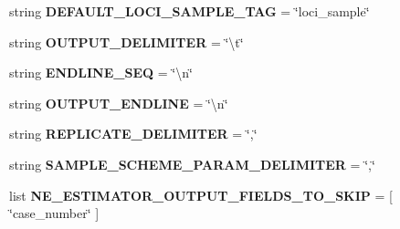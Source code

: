 \begin{DoxyCompactItemize}
\item 
string {\bfseries D\+E\+F\+A\+U\+L\+T\+\_\+\+L\+O\+C\+I\+\_\+\+S\+A\+M\+P\+L\+E\+\_\+\+T\+AG} = \char`\"{}loci\+\_\+sample\char`\"{}\hypertarget{namespacenegui_1_1pgdriveneestimator_a31ddb30a42003f3bd52b0209ecd9616d}{}\label{namespacenegui_1_1pgdriveneestimator_a31ddb30a42003f3bd52b0209ecd9616d}

\item 
string {\bfseries O\+U\+T\+P\+U\+T\+\_\+\+D\+E\+L\+I\+M\+I\+T\+ER} = \char`\"{}\textbackslash{}t\char`\"{}\hypertarget{namespacenegui_1_1pgdriveneestimator_a68b08075d6e1a58ae325c600881c9d6c}{}\label{namespacenegui_1_1pgdriveneestimator_a68b08075d6e1a58ae325c600881c9d6c}

\item 
string {\bfseries E\+N\+D\+L\+I\+N\+E\+\_\+\+S\+EQ} = \char`\"{}\textbackslash{}n\char`\"{}\hypertarget{namespacenegui_1_1pgdriveneestimator_aa8d38cb5ca07a3c1f89cd4c3d7cccb08}{}\label{namespacenegui_1_1pgdriveneestimator_aa8d38cb5ca07a3c1f89cd4c3d7cccb08}

\item 
string {\bfseries O\+U\+T\+P\+U\+T\+\_\+\+E\+N\+D\+L\+I\+NE} = \char`\"{}\textbackslash{}n\char`\"{}\hypertarget{namespacenegui_1_1pgdriveneestimator_a56a1a1d753221dfbed6ffc7cd58222f1}{}\label{namespacenegui_1_1pgdriveneestimator_a56a1a1d753221dfbed6ffc7cd58222f1}

\item 
string {\bfseries R\+E\+P\+L\+I\+C\+A\+T\+E\+\_\+\+D\+E\+L\+I\+M\+I\+T\+ER} = \char`\"{},\char`\"{}\hypertarget{namespacenegui_1_1pgdriveneestimator_a4a72408d1cee500503a7aa185253b438}{}\label{namespacenegui_1_1pgdriveneestimator_a4a72408d1cee500503a7aa185253b438}

\item 
string {\bfseries S\+A\+M\+P\+L\+E\+\_\+\+S\+C\+H\+E\+M\+E\+\_\+\+P\+A\+R\+A\+M\+\_\+\+D\+E\+L\+I\+M\+I\+T\+ER} = \char`\"{},\char`\"{}\hypertarget{namespacenegui_1_1pgdriveneestimator_a968165e72c6ac1b942ae21dc2ec18af2}{}\label{namespacenegui_1_1pgdriveneestimator_a968165e72c6ac1b942ae21dc2ec18af2}

\item 
list {\bfseries N\+E\+\_\+\+E\+S\+T\+I\+M\+A\+T\+O\+R\+\_\+\+O\+U\+T\+P\+U\+T\+\_\+\+F\+I\+E\+L\+D\+S\+\_\+\+T\+O\+\_\+\+S\+K\+IP} = \mbox{[} \char`\"{}case\+\_\+number\char`\"{} \mbox{]}\hypertarget{namespacenegui_1_1pgdriveneestimator_a77c91566694093f57286607ae144d35a}{}\label{namespacenegui_1_1pgdriveneestimator_a77c91566694093f57286607ae144d35a}


\end{DoxyCompactItemize}

